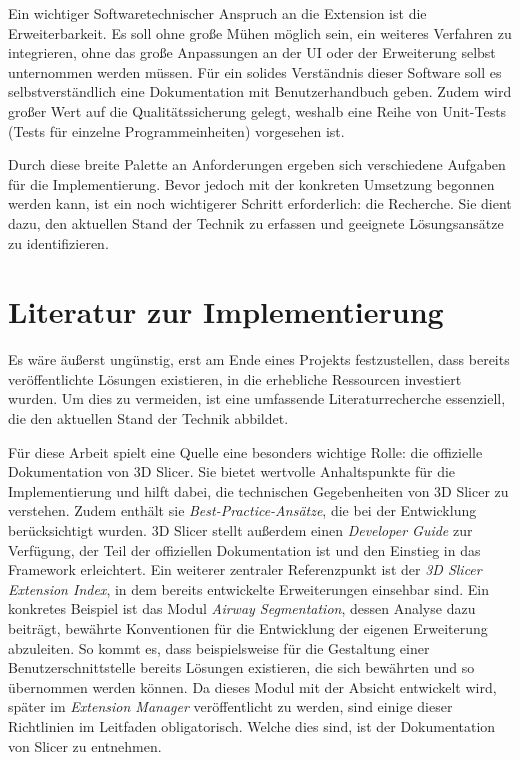 Ein wichtiger Softwaretechnischer Anspruch an die Extension ist die
Erweiterbarkeit. Es soll ohne große Mühen möglich sein, ein weiteres Verfahren
zu integrieren, ohne das große Anpassungen an der UI oder der Erweiterung selbst
unternommen werden müssen. Für ein solides Verständnis dieser Software soll es
selbstverständlich eine Dokumentation mit Benutzerhandbuch geben. Zudem wird großer
Wert auf die Qualitätssicherung gelegt, weshalb eine Reihe von Unit-Tests (Tests
für einzelne Programmeinheiten) vorgesehen ist.

Durch diese breite Palette an Anforderungen ergeben sich verschiedene Aufgaben
für die Implementierung. Bevor jedoch mit der konkreten Umsetzung begonnen werden
kann, ist ein noch wichtigerer Schritt erforderlich: die Recherche. Sie dient
dazu, den aktuellen Stand der Technik zu erfassen und geeignete Lösungsansätze zu
identifizieren.

\section{Literatur zur Implementierung}
Es wäre äußerst ungünstig, erst am Ende eines Projekts festzustellen, dass bereits
veröffentlichte Lösungen existieren, in die erhebliche Ressourcen investiert
wurden. Um dies zu vermeiden, ist eine umfassende Literaturrecherche essenziell,
die den aktuellen Stand der Technik abbildet.

Für diese Arbeit spielt eine Quelle eine besonders wichtige Rolle: die
offizielle Dokumentation von 3D Slicer. Sie bietet wertvolle Anhaltspunkte für die
Implementierung und hilft dabei, die technischen Gegebenheiten von 3D Slicer zu
verstehen. Zudem enthält sie \textit{Best-Practice-Ansätze}, die bei der Entwicklung
berücksichtigt wurden. 3D Slicer stellt außerdem einen \textit{Developer Guide} zur
Verfügung, der Teil der offiziellen Dokumentation ist und den Einstieg in das
Framework erleichtert. Ein weiterer zentraler Referenzpunkt ist der \textit{3D
Slicer Extension Index}, in dem bereits entwickelte Erweiterungen einsehbar sind.
Ein konkretes Beispiel ist das Modul \textit{Airway Segmentation}, dessen
Analyse dazu beiträgt, bewährte Konventionen für die Entwicklung der eigenen Erweiterung
abzuleiten. So kommt es, dass beispielsweise für die Gestaltung einer Benutzerschnittstelle
bereits Lösungen existieren, die sich bewährten und so übernommen werden können.
Da dieses Modul mit der Absicht entwickelt wird, später im \textit{Extension
Manager} veröffentlicht zu werden, sind einige dieser Richtlinien im Leitfaden
obligatorisch. Welche dies sind, ist der Dokumentation von Slicer zu entnehmen.


